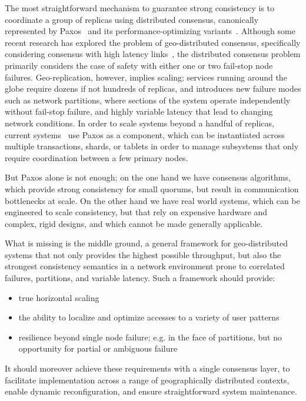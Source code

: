 \documentclass[sigplan,screen,review,anonymous,nonacm]{acmart}
\begin{document}
The most straightforward mechanism to guarantee strong consistency is to coordinate 
a group of replicas using distributed consensus, canonically represented by 
Paxos~\cite{paxos_simple} and its performance-optimizing 
variants~\cite{fast_paxos,multicoordinated_paxos,spaxos,generalized_paxos}. 
Although some recent research has explored the problem of geo-distributed consensus, 
specifically considering consensus with high latency links~\cite{mencius,epaxos}, 
the distributed consensus problem primarily considers the case of safety with either
one or two fail-stop node failures. 
Geo-replication, however, implies scaling; services running around the globe require
dozens if not hundreds of replicas, and introduces new failure modes such as network
partitions, where sections of the system operate independently without fail-stop 
failure, and highly variable latency that lead to changing network conditions. 
In order to scale systems beyond a handful of replicas, current 
systems~\cite{mdcc,calvinfs,spanner,scatter} use Paxos as a component, which can be 
instantiated across multiple transactions, shards, or tablets in order to manage 
subsystems that only require coordination between a few primary nodes. 

But Paxos alone is not enough; on the one hand we have consensus algorithms, which 
provide strong consistency for small quorums, but result in communication bottlenecks
at scale.
On the other hand we have real world systems, which can be engineered to scale 
consistency, but that rely on expensive hardware and complex, rigid designs,
and which cannot be made generally applicable. 

What is missing is the middle ground, a general framework for geo-distributed systems
that not only provides the highest possible throughput, but also the strongest 
consistency semantics in a network environment prone to correlated failures, 
partitions, and variable latency.
Such a framework should provide: 
\renewcommand{\baselinestretch}{1}
\begin{itemize}
    \item true horizontal scaling
    \item the ability to localize and optimize accesses to a variety of user patterns
    \item resilience beyond single node failure; e.g. in the face of partitions, but no 
    opportunity for partial or ambiguous failure
\end{itemize}
\renewcommand{\baselinestretch}{2}
It should moreover achieve these requirements with a single consensus layer, to facilitate 
implementation across a range of geographically distributed contexts, enable dynamic 
reconfiguration, and ensure straightforward system maintenance.
\end{document}

